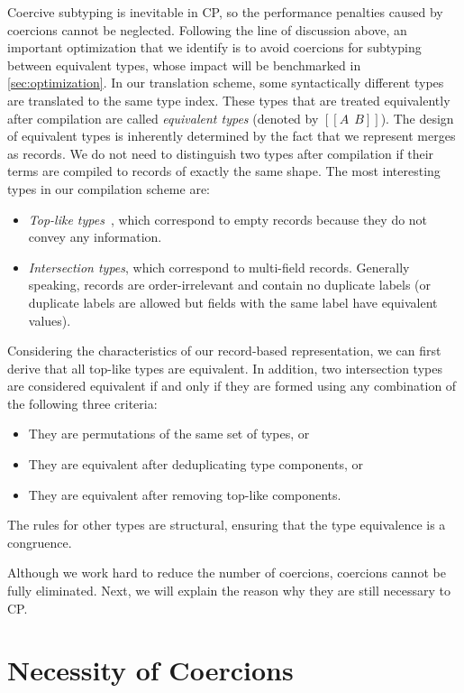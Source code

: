 Coercive subtyping is inevitable in CP, so the performance penalties caused by
coercions cannot be neglected. Following the line of discussion above, an
important optimization that we identify is to avoid coercions for subtyping
between equivalent types, whose impact will be benchmarked in
\autoref{sec:optimization}. In our translation scheme, some syntactically
different types are translated to the same type index. These types that are
treated equivalently after compilation are called \emph{equivalent types}
(denoted by $[[A~~B]]$). The design of equivalent types is inherently determined
by the fact that we represent merges as records. We do not need to distinguish
two types after compilation if their terms are compiled to records of exactly
the same shape. The most interesting types in our compilation scheme are:
\begin{itemize}
\item \emph{Top-like types}~\citep{oliveira2016disjoint}, which correspond to
empty records because they do not convey any information.
\item \emph{Intersection types}, which correspond to multi-field records.
Generally speaking, records are order-irrelevant and contain no duplicate labels
(or duplicate labels are allowed but fields with the same label have equivalent
values).
\end{itemize}
Considering the characteristics of our record-based representation, we can first
derive that all top-like types are equivalent. In addition, two intersection
types are considered equivalent if and only if they are formed using any
combination of the following three criteria:
\begin{itemize}
\item They are permutations of the same set of types, or
\item They are equivalent after deduplicating type components, or
\item They are equivalent after removing top-like components.
\end{itemize}
The rules for other types are structural, ensuring that the type equivalence is
a congruence.

Although we work hard to reduce the number of coercions, coercions cannot be
fully eliminated. Next, we will explain the reason why they are still necessary
to CP.

\section{Necessity of Coercions}

